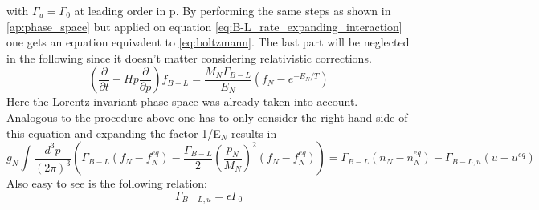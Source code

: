 with $\Gamma_u=\Gamma_0$ at leading order in p. \newline
By performing the same steps as shown in \ref{ap:phase_space} but applied on equation \ref{eq:B-L_rate_expanding_interaction} one gets an equation equivalent to \ref{eq:boltzmann}. The last part will be neglected in the following since it doesn't matter considering relativistic corrections.
\begin{equation*}
\left(\frac{\partial}{\partial t}-Hp\frac{\partial}{\partial p}\right)f_{B-L}=\frac{M_N\Gamma_{B-L}}{E_N}\left(f_N-e^{-E_N/T}\right)
\end{equation*}
Here the Lorentz invariant phase space was already taken into account.\newline
Analogous to the procedure above one has to only consider the right-hand side of this equation and expanding the factor 1/E$_N$ results in
\begin{equation*}
g_N\int \frac{d^3p}{(2\pi)^3}\left(\Gamma_{B-L}\left(f_N-f_N^{eq}\right)-\frac{\Gamma_{B-L}}{2}\left(\frac{p_N}{M_N}\right)^2\left(f_N-f_N^{eq}\right)\right)=\Gamma_{B-L}\left(n_N-n_N^{eq}\right)-\Gamma_{B-L,u}\left(u-u^{eq}\right)
\end{equation*}
Also easy to see is the following relation:
\begin{equation*}
	\Gamma_{B-L,u}=\epsilon\Gamma_0
\end{equation*}
